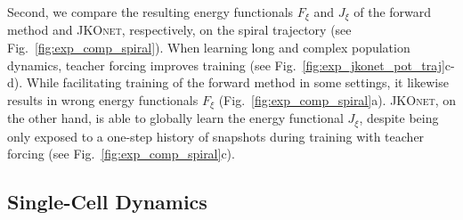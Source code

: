 Second, we compare the resulting energy functionals $F_\xi$ and $J_\xi$ of the forward method and \textsc{JKOnet}, respectively, on the spiral trajectory (see Fig.~\ref{fig:exp_comp_spiral}).
When learning long and complex population dynamics, teacher forcing improves training (see Fig.~\ref{fig:exp_jkonet_pot_traj}c-d).
While facilitating training of the forward method in some settings, it likewise results in wrong energy functionals $F_\xi$ (Fig.~\ref{fig:exp_comp_spiral}a).
\textsc{JKOnet}, on the other hand, is able to globally learn the energy functional $J_\xi$, despite being only exposed to a one-step history of snapshots during training with teacher forcing (see Fig.~\ref{fig:exp_comp_spiral}c).

\subsection{Single-Cell Dynamics}
\label{sec:jkonet_cell}

